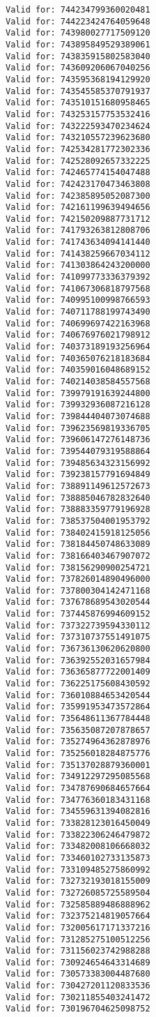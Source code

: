 \documentclass[11pt]{article}
\begin{document}
\begin{Verbatim}[commandchars=\\\{\}]
Valid for: 744234799360020481
Valid for: 744223424764059648
Valid for: 743980027717509120
Valid for: 743895849529389061
Valid for: 743835915802583040
Valid for: 743609206067040256
Valid for: 743595368194129920
Valid for: 743545585370791937
Valid for: 743510151680958465
Valid for: 743253157753532416
Valid for: 743222593470234624
Valid for: 743210557239623680
Valid for: 742534281772302336
Valid for: 742528092657332225
Valid for: 742465774154047488
Valid for: 742423170473463808
Valid for: 742385895052087300
Valid for: 742161199639494656
Valid for: 742150209887731712
Valid for: 741793263812808706
Valid for: 741743634094141440
Valid for: 741438259667034112
Valid for: 741303864243200000
Valid for: 741099773336379392
Valid for: 741067306818797568
Valid for: 740995100998766593
Valid for: 740711788199743490
Valid for: 740699697422163968
Valid for: 740676976021798912
Valid for: 740373189193256964
Valid for: 740365076218183684
Valid for: 740359016048689152
Valid for: 740214038584557568
Valid for: 739979191639244800
Valid for: 739932936087216128
Valid for: 739844404073074688
Valid for: 739623569819336705
Valid for: 739606147276148736
Valid for: 739544079319588864
Valid for: 739485634323156992
Valid for: 739238157791694849
Valid for: 738891149612572673
Valid for: 738885046782832640
Valid for: 738883359779196928
Valid for: 738537504001953792
Valid for: 738402415918125056
Valid for: 738184450748633089
Valid for: 738166403467907072
Valid for: 738156290900254721
Valid for: 737826014890496000
Valid for: 737800304142471168
Valid for: 737678689543020544
Valid for: 737445876994609152
Valid for: 737322739594330112
Valid for: 737310737551491075
Valid for: 736736130620620800
Valid for: 736392552031657984
Valid for: 736365877722001409
Valid for: 736225175608430592
Valid for: 736010884653420544
Valid for: 735991953473572864
Valid for: 735648611367784448
Valid for: 735635087207878657
Valid for: 735274964362878976
Valid for: 735256018284875776
Valid for: 735137028879360001
Valid for: 734912297295085568
Valid for: 734787690684657664
Valid for: 734776360183431168
Valid for: 734559631394082816
Valid for: 733828123016450049
Valid for: 733822306246479872
Valid for: 733482008106668032
Valid for: 733460102733135873
Valid for: 733109485275860992
Valid for: 732732193018155009
Valid for: 732726085725589504
Valid for: 732585889486888962
Valid for: 732375214819057664
Valid for: 732005617171337216
Valid for: 731285275100512256
Valid for: 731156023742988288
Valid for: 730924654643314689
Valid for: 730573383004487680
Valid for: 730427201120833536
Valid for: 730211855403241472
Valid for: 730196704625098752

\end{Verbatim}
\end{document}
